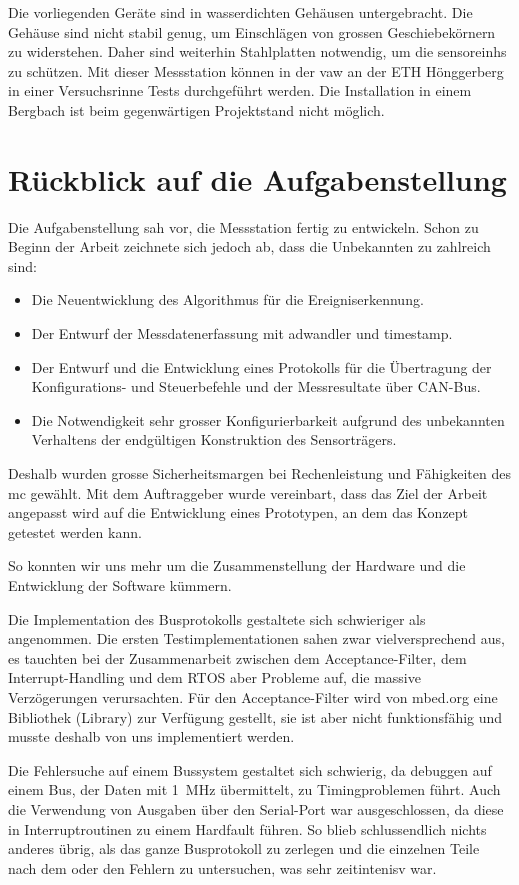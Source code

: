 Die vorliegenden Geräte sind in wasserdichten Gehäusen untergebracht. Die Gehäuse sind nicht stabil genug, um Einschlägen von grossen Geschiebekörnern zu widerstehen. Daher sind weiterhin Stahlplatten notwendig, um die \glspl{sensoreinh} zu schützen. Mit dieser Messstation können in der \gls{vaw} an der ETH Hönggerberg in einer Versuchsrinne Tests durchgeführt werden. Die Installation in einem Bergbach ist beim gegenwärtigen Projektstand nicht möglich.

\section{Rückblick auf die Aufgabenstellung}
Die Aufgabenstellung sah vor, die Messstation fertig zu entwickeln. Schon zu Beginn der Arbeit zeichnete sich jedoch ab, dass die Unbekannten zu zahlreich sind:
\begin{itemize}
\item Die Neuentwicklung des Algorithmus für die Ereigniserkennung.
\item Der Entwurf der Messdatenerfassung mit \gls{adwandler} und \gls{timestamp}.
\item Der Entwurf und die Entwicklung eines Protokolls für die Übertragung der Konfigurations- und Steuerbefehle und der Messresultate über CAN-Bus.
\item Die Notwendigkeit sehr grosser Konfigurierbarkeit aufgrund des unbekannten Verhaltens der endgültigen Konstruktion des Sensorträgers.
\end{itemize}

Deshalb wurden grosse Sicherheitsmargen bei Rechenleistung und Fähigkeiten des \gls{mc} gewählt. Mit dem Auftraggeber wurde vereinbart, dass das Ziel der Arbeit angepasst wird auf die Entwicklung eines Prototypen, an dem das Konzept getestet werden kann.

So konnten wir uns mehr um die Zusammenstellung der Hardware und die Entwicklung der Software kümmern.

Die Implementation des Busprotokolls gestaltete sich schwieriger als angenommen. Die ersten Testimplementationen sahen zwar vielversprechend aus, es tauchten bei der Zusammenarbeit zwischen dem Acceptance-Filter, dem Interrupt-Handling und dem RTOS aber Probleme auf, die massive Verzögerungen verursachten. Für den Acceptance-Filter wird von mbed.org eine Bibliothek (Library) zur Verfügung gestellt, sie ist aber nicht funktionsfähig und musste deshalb von uns implementiert werden.

Die Fehlersuche auf einem Bussystem gestaltet sich schwierig, da debuggen auf einem Bus, der Daten mit 1~MHz übermittelt, zu Timingproblemen führt. Auch die Verwendung von Ausgaben über den Serial-Port war ausgeschlossen, da diese in Interruptroutinen zu einem Hardfault führen. So blieb schlussendlich nichts anderes übrig, als das ganze Busprotokoll zu zerlegen und die einzelnen Teile nach dem oder den Fehlern zu untersuchen, was sehr zeitintenisv war.

